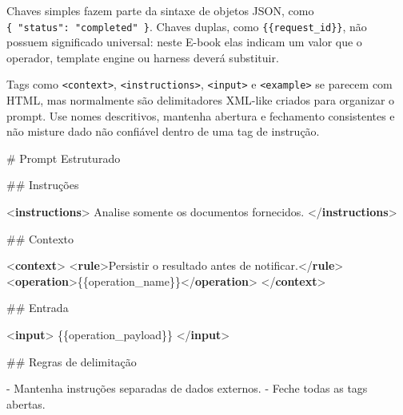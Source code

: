 \documentclass[
  10pt,
  a4paper,
  oneside]{book}
\newenvironment{Shaded}{}{}
\newcommand{\DataTypeTok}[1]{\textcolor[rgb]{0.56,0.13,0.00}{#1}}
\newcommand{\FunctionTok}[1]{\textcolor[rgb]{0.02,0.16,0.49}{#1}}
\newcommand{\KeywordTok}[1]{\textcolor[rgb]{0.00,0.44,0.13}{\textbf{#1}}}
\newcommand{\NormalTok}[1]{#1}
\newcommand{\SpecialStringTok}[1]{\textcolor[rgb]{0.73,0.40,0.53}{#1}}
\begin{document}
Chaves simples fazem parte da sintaxe de objetos JSON, como
\texttt{\{\ "status":\ "completed"\ \}}. Chaves duplas, como
\texttt{\{\{request\_id\}\}}, não possuem significado universal: neste
E-book elas indicam um valor que o operador, template engine ou harness
deverá substituir.

Tags como \texttt{\textless{}context\textgreater{}},
\texttt{\textless{}instructions\textgreater{}},
\texttt{\textless{}input\textgreater{}} e
\texttt{\textless{}example\textgreater{}} se parecem com HTML, mas
normalmente são delimitadores XML-like criados para organizar o prompt.
Use nomes descritivos, mantenha abertura e fechamento consistentes e não
misture dado não confiável dentro de uma tag de instrução.

\begin{Shaded}
\begin{Highlighting}[]
\FunctionTok{\# Prompt Estruturado}

\FunctionTok{\#\# Instruções}

\DataTypeTok{\textless{}}\KeywordTok{instructions}\DataTypeTok{\textgreater{}}
\NormalTok{Analise somente os documentos fornecidos.}
\DataTypeTok{\textless{}/}\KeywordTok{instructions}\DataTypeTok{\textgreater{}}

\FunctionTok{\#\# Contexto}

\DataTypeTok{\textless{}}\KeywordTok{context}\DataTypeTok{\textgreater{}}
  \DataTypeTok{\textless{}}\KeywordTok{rule}\DataTypeTok{\textgreater{}}\NormalTok{Persistir o resultado antes de notificar.}\DataTypeTok{\textless{}/}\KeywordTok{rule}\DataTypeTok{\textgreater{}}
  \DataTypeTok{\textless{}}\KeywordTok{operation}\DataTypeTok{\textgreater{}}\NormalTok{\{\{operation\_name\}\}}\DataTypeTok{\textless{}/}\KeywordTok{operation}\DataTypeTok{\textgreater{}}
\DataTypeTok{\textless{}/}\KeywordTok{context}\DataTypeTok{\textgreater{}}

\FunctionTok{\#\# Entrada}

\DataTypeTok{\textless{}}\KeywordTok{input}\DataTypeTok{\textgreater{}}
\NormalTok{\{\{operation\_payload\}\}}
\DataTypeTok{\textless{}/}\KeywordTok{input}\DataTypeTok{\textgreater{}}

\FunctionTok{\#\# Regras de delimitação}

\SpecialStringTok{{-} }\NormalTok{Mantenha instruções separadas de dados externos.}
\SpecialStringTok{{-} }\NormalTok{Feche todas as tags abertas.}
\end{Highlighting}
\end{Shaded}
\end{document}
